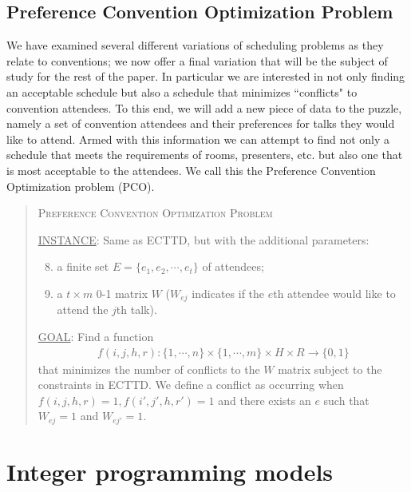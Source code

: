 \documentclass[]{article}
\theoremstyle{definition}
\theoremstyle{remark}
\numberwithin{equation}{section}
\begin{document}
\subsection{Preference Convention Optimization Problem}
We have examined several different variations of scheduling problems as they relate to conventions; we now offer a final variation that will be the subject of study for the rest of the paper. In particular we are interested in not only finding an acceptable schedule but also a schedule that minimizes ``conflicts" to convention attendees. To this end, we will add a new piece of data to the puzzle, namely a set of convention attendees and their preferences for talks they would like to attend. Armed with this information we can attempt to find not only a schedule that meets the requirements of rooms, presenters, etc. but also one that is most acceptable to the attendees. We call this the Preference Convention Optimization problem (PCO).
\begin{quote}
	\textsc{Preference Convention Optimization Problem}
	
	\underline{INSTANCE}: Same as ECTTD, but with the additional parameters:
	\begin{enumerate}[1.]
		\setcounter{enumi}{7}
		\item a finite set $E = \{e_1, e_2, \cdots, e_t\}$ of attendees;
		\item a $t \times m$ 0-1 matrix $W$ ($W_{ej}$ indicates if the $e$th attendee would like to attend the $j$th talk).
	\end{enumerate}
	
	\underline{GOAL}: Find a function 
	\begin{gather*}
		f(i,j,h,r) : \{1,\cdots,n\} \times \{1,\cdots,m\} \times H \times R \rightarrow \{0,1\}
	\end{gather*}
	that minimizes the number of conflicts to the $W$ matrix subject to the constraints in ECTTD. We define a conflict as occurring when $f(i,j,h,r)=1, f(i',j',h,r')=1$ and there exists an $e$ such that $W_{ej}=1$ and $W_{ej'}=1$.
\end{quote}

\section{Integer programming models}
\end{document}
